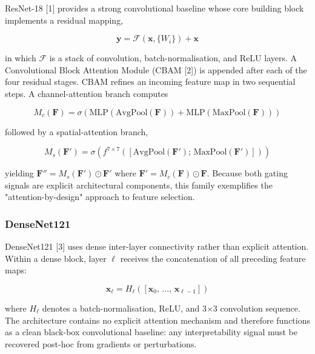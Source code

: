 \documentclass[11pt,a4paper]{article}
\begin{document}
ResNet-18 [1] provides a strong convolutional baseline whose core building block implements a residual mapping,

\begin{equation}
\mathbf{y} = \mathcal{F}(\mathbf{x}, \{W_i\}) + \mathbf{x}
\tag{1}
\end{equation}

in which $\mathcal{F}$ is a stack of convolution, batch-normalisation, and ReLU layers. A Convolutional Block Attention Module (CBAM [2]) is appended after each of the four residual stages. CBAM refines an incoming feature map in two sequential steps. A channel-attention branch computes

\begin{equation}
M_c(\mathbf{F}) = \sigma\!\left(\text{MLP}(\text{AvgPool}(\mathbf{F})) + \text{MLP}(\text{MaxPool}(\mathbf{F}))\right)
\tag{2}
\end{equation}

followed by a spatial-attention branch,

\begin{equation}
M_s(\mathbf{F}') = \sigma\!\left(f^{7{\times}7}\!\left([\text{AvgPool}(\mathbf{F}');\, \text{MaxPool}(\mathbf{F}')]\right)\right)
\tag{3}
\end{equation}

yielding $\mathbf{F}'' = M_s(\mathbf{F}') \odot \mathbf{F}'$ where $\mathbf{F}' = M_c(\mathbf{F}) \odot \mathbf{F}$. Because both gating signals are explicit architectural components, this family exemplifies the "attention-by-design" approach to feature selection.

\subsubsection{DenseNet121}

DenseNet121 [3] uses dense inter-layer connectivity rather than explicit attention. Within a dense block, layer $\ell$ receives the concatenation of all preceding feature maps:

\begin{equation}
\mathbf{x}_\ell = H_\ell\!\left([\mathbf{x}_0,\, \ldots,\, \mathbf{x}_{\ell-1}]\right)
\tag{4}
\end{equation}

where $H_\ell$ denotes a batch-normalisation, ReLU, and 3$\times$3 convolution sequence. The architecture contains no explicit attention mechanism and therefore functions as a clean black-box convolutional baseline: any interpretability signal must be recovered post-hoc from gradients or perturbations.
\end{document}
